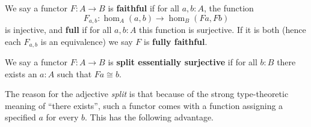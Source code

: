 \documentclass{amsart}
\theoremstyle{definition}
\theoremstyle{remark}
\numberwithin{equation}{section}
\begin{document}
\begin{defn}
  We say a functor $F:A\to B$ is \textbf{faithful} if for all $a,b:A$, the function
  \[F_{a,b}:\hom_A(a,b) \to \hom_B(Fa,Fb)\]
  is injective, and \textbf{full} if for all $a,b:A$ this function is surjective.
  If it is both (hence each $F_{a,b}$ is an equivalence) we say $F$ is \textbf{fully faithful}.
\end{defn}

\begin{defn}
  We say a functor $F:A\to B$ is \textbf{split essentially surjective} if for all $b:B$ there exists an $a:A$ such that $Fa\cong b$.
\end{defn}

The reason for the adjective \emph{split} is that because of the strong type-theoretic meaning of ``there exists'', such a functor comes with a function assigning a specified $a$ for every $b$.
This has the following advantage.
\end{document}
